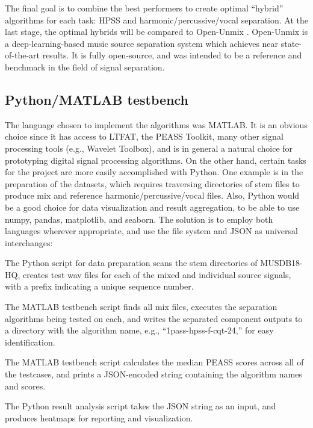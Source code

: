 \documentclass[letter,12pt]{article}
\newenvironment{tight_enumerate}{
\begin{enumerate}
  \setlength{\itemsep}{0pt}
  \setlength{\parskip}{0pt}
}{\end{enumerate}}
\begin{document}
The final goal is to combine the best performers to create optimal ``hybrid'' algorithms for each task: HPSS and harmonic/percussive/vocal separation. At the last stage, the optimal hybrids will be compared to Open-Unmix \cite{umx}. Open-Unmix is a deep-learning-based music source separation system which achieves near state-of-the-art results. It is fully open-source, and was intended to be a reference and benchmark in the field of signal separation.

\subsection{Python/MATLAB testbench}

The language chosen to implement the algorithms was MATLAB. It is an obvious choice since it has access to LTFAT, the PEASS Toolkit, many other signal processing tools (e.g., Wavelet Toolbox), and is in general a natural choice for prototyping digital signal processing algorithms. On the other hand, certain tasks for the project are more easily accomplished with Python. One example is in the preparation of the datasets, which requires traversing directories of stem files to produce mix and reference harmonic/percussive/vocal files. Also, Python would be a good choice for data visualization and result aggregation, to be able to use numpy\cite{numpy}, pandas\cite{pandas}, matplotlib\cite{matplotlib}, and seaborn\cite{seaborn}. The solution is to employ both languages wherever appropriate, and use the file system and JSON as universal interchanges:
\begin{tight_enumerate}
\item
	The Python script for data preparation scans the stem directories of MUSDB18-HQ, creates test wav files for each of the mixed and individual source signals, with a prefix indicating a unique sequence number.
\item
	The MATLAB testbench script finds all mix files, executes the separation algorithms being tested on each, and writes the separated component outputs to a directory with the algorithm name, e.g., ``1pass-hpss-f-cqt-24,'' for easy identification.
\item
	The MATLAB testbench script calculates the median PEASS scores across all of the testcases, and prints a JSON-encoded string containing the algorithm names and scores.
\item
	The Python result analysis script takes the JSON string as an input, and produces heatmaps for reporting and visualization.
\end{tight_enumerate}
\end{document}
